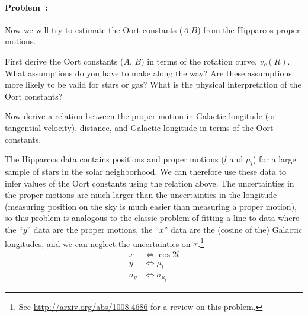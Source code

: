 \documentclass[12pt,twoside]{article}
\newcommand{\problemname}{Problem}
\newcounter{problem}
\newenvironment{problem}{\paragraph{\problemname~\theproblem:}\refstepcounter{problem}}{}
\begin{document}
\begin{problem}
Now we will try to estimate the Oort constants ($A$,$B$) from the Hipparcos proper motions. 

 First derive the Oort constants ($A$, $B$) in terms of the rotation curve, $v_c(R)$. What assumptions do you have to make along the way? Are these assumptions more likely to be valid for stars or gas? What is the physical interpretation of the Oort constants?

\bigskip
{} Now derive a relation between the proper motion in Galactic longitude (or tangential velocity), distance, and Galactic longitude in terms of the Oort constants. 

\bigskip
{} The Hipparcos data contains positions and proper motions ($l$ and $\mu_l$) for a large sample of stars in the solar neighborhood. We can therefore use these data to infer values of the Oort constants using the relation above. The uncertainties in the proper motions are much larger than the uncertainties in the longitude (measuring position on the sky is much easier than measuring a proper motion), so this problem is analogous to the classic problem of fitting a line to data where the ``$y$'' data are the proper motions, the ``$x$'' data are the (cosine of the) Galactic longitudes, and we can neglect the uncertainties on $x$.\footnote{See \url{http://arxiv.org/abs/1008.4686} for a review on this problem.}
\begin{align}
	x &\iff \cos{2l} \\
	y &\iff \mu_l \\
	\sigma_y &\iff \sigma_{\mu_l}
\end{align}


\end{problem}
\end{document}
